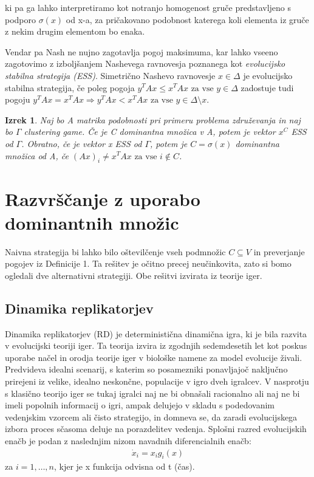 \documentclass[a4paper]{article}
\newtheorem{theorem}{Izrek}
\begin{document}
ki pa ga lahko interpretiramo kot notranjo homogenost gruče predstavljeno s podporo $\sigma(x)$ od x-a, za pričakovano podobnost katerega koli elementa iz gruče z nekim drugim elementom bo enaka.









Vendar pa Nash ne nujno zagotavlja pogoj maksimuma, kar lahko vseeno zagotovimo z izboljšanjem Nashevega ravnovesja poznanega kot \textit{evolucijsko stabilna strategija (ESS)}. Simetrično Nashevo ravnovesje $x\in\Delta$ je evolucijsko stabilna strategija, če poleg pogoja $y^TAx\leq x^TAx \text{ za vse } y\in\Delta$ zadostuje tudi pogoju $y^TAx= x^TAx \Rightarrow y^TAx<x^TAx \text{ za vse } y\in\Delta\setminus x$.
\begin{theorem}
Naj bo A matrika podobnosti pri primeru problema združevanja in naj bo $\Gamma$ \textit{clustering game}. Če je C dominantna množica v A, potem je vektor $x^C$ ESS od $\Gamma$. Obratno, če je vektor x ESS od $\Gamma$, potem je $C=\sigma(x)$ dominantna množica od A, če $(Ax)_i\not=x^TAx \text{ za vse } i \not\in C$.
\end{theorem}

\section{Razvrščanje z uporabo dominantnih množic}
Naivna strategija bi lahko bilo oštevilčenje vseh podmnožic $C\subseteq V$ in preverjanje pogojev iz Definicije 1. Ta rešitev je očitno precej neučinkovita, zato si bomo ogledali dve alternativni strategiji. Obe rešitvi izvirata iz teorije iger.









\subsection{Dinamika replikatorjev}
Dinamika replikatorjev (RD) je deterministična dinamična igra, ki je bila razvita v evolucijski teoriji iger. Ta teorija izvira iz zgodnjih sedemdesetih let kot poskus uporabe načel in orodja teorije iger v biološke namene za model evolucije živali. Predvideva idealni scenarij, s katerim so posamezniki ponavljajoč naključno prirejeni iz velike, idealno neskončne, populacije v igro dveh igralcev. V nasprotju s klasično teorijo iger se tukaj igralci naj ne bi obnašali racionalno ali naj ne bi imeli popolnih informacij o igri, ampak delujejo v skladu s podedovanim vedenjskim vzorcem ali čisto strategijo, in domneva se, da zaradi evolucijskega izbora proces sčasoma deluje na porazdelitev vedenja. Splošni razred evolucijskih enačb je podan z naslednjim nizom navadnih diferencialnih enačb:
\begin{gather}
\dot{x}_i = x_i g_i (x)
\end{gather}
za $i = 1,\ldots,n$, kjer je x funkcija odvisna od t (čas).
\end{document}
